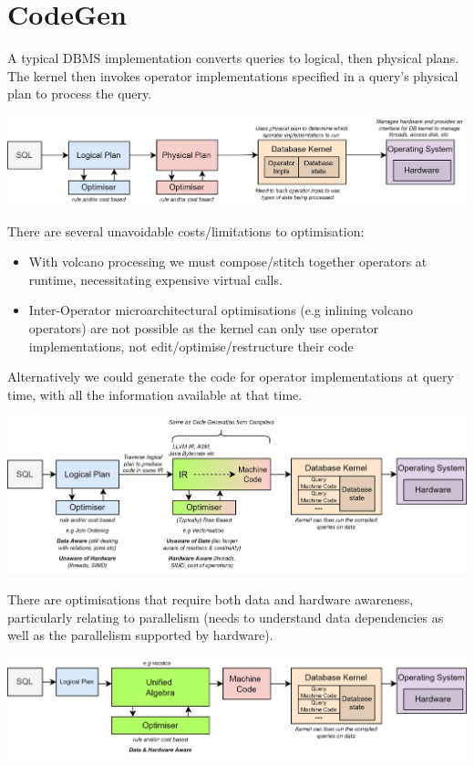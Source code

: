 \section{CodeGen}
A typical DBMS implementation converts queries to logical, then physical plans. The kernel then invokes operator implementations specified in a query's physical plan to process the query. 
\begin{center}
    \includegraphics[width=\textwidth]{advanced_topics/images/naive_query_path.drawio.png}
\end{center}
There are several unavoidable costs/limitations to optimisation:
\begin{itemize}
    \item With volcano processing we must compose/stitch together operators at runtime, necessitating expensive virtual calls.
    \item Inter-Operator microarchitectural optimisations (e.g inlining volcano operators) are not possible as the kernel can only use operator implementations, not edit/optimise/restructure their code
\end{itemize}
Alternatively we could generate the code for operator implementations at query time, with all the information available at that time.
\begin{center}
    \includegraphics[width=\textwidth]{advanced_topics/images/query_compilation_path.drawio.png}
\end{center}
There are optimisations that require both data and hardware awareness, particularly relating to parallelism (needs to understand data dependencies as well as the parallelism supported by hardware).
\begin{center}
    \includegraphics[width=\textwidth]{advanced_topics/images/unified_algebra_path.drawio.png}
\end{center}

